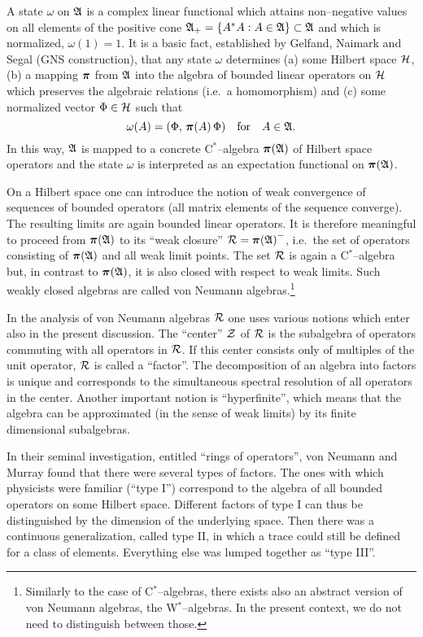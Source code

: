 A state $\omega$ on ${\mathfrak A}$ 
is a complex linear functional which 
attains non--negative values 
on all elements of the positive cone 
${\mathfrak A}_+ = \{ A^* A : A \in {\mathfrak A} \} \subset {\mathfrak A}$ 
and which is normalized, $\omega (1) = 1$. 
It is a basic fact, established by Gelfand, Naimark and 
Segal (GNS construction), that any state $\omega$ determines
(a) some Hilbert space ${\cal H}$, (b) a mapping 
$\mbox{{\boldmath $\pi$}}$ from ${\mathfrak A}$ into the algebra of bounded linear 
operators on ${\cal H}$ which preserves the algebraic 
relations (i.e.\ a homomorphism) and (c) some normalized vector 
$\Phi \in {\cal H}$ such that 
\begin{equation}
\omega (A) = (\Phi, \, \mbox{{\boldmath $\pi$}} (A) \, \Phi)
\quad \mbox{for} \quad A \in {\mathfrak A}.       
\end{equation}
In this way, ${\mathfrak A}$ is mapped to a concrete
C$^*$--algebra $\mbox{{\boldmath $\pi$}} ({\mathfrak A})$ of Hilbert space operators and 
the state $\omega$ is interpreted as an expectation functional 
on $\mbox{{\boldmath $\pi$}} ({\mathfrak A})$. 

On a Hilbert space one can introduce the 
notion of weak convergence of sequences of bounded operators 
(all matrix elements of the sequence converge). The 
resulting limits are again bounded linear operators.  
It is therefore meaningful to proceed from 
$\mbox{{\boldmath $\pi$}} ({\mathfrak A})$ to its ``weak closure'' 
${\cal R} = {\mbox{{\boldmath $\pi$}} ({\mathfrak A}) }^-$, i.e.\ the set of operators 
consisting of  $\mbox{{\boldmath $\pi$}} ({\mathfrak A})$ and all weak limit points. 
The set ${\cal R}$ is again a C$^*$--algebra but, in contrast 
to $\mbox{{\boldmath $\pi$}} ({\mathfrak A})$, it is also closed with respect to weak limits. 
Such weakly closed algebras are called 
von Neumann algebras.\footnote{Similarly to the 
case of C$^*$--algebras, there exists also an abstract version of 
von Neumann algebras, the W$^*$--algebras. In the present context, 
we do not need to distinguish between those.}

In the analysis of von Neumann algebras ${\cal R}$ one uses 
various notions which enter also in the present discussion. 
The ``center'' $\cal Z$ of $\cal R$ is the subalgebra 
of operators commuting with all operators in $\cal R$.
If this center consists only of multiples of the unit operator, $\cal
R$ is called a ``factor''. The decomposition of an algebra into
factors is unique and corresponds to the simultaneous 
spectral resolution of all operators in the
center. Another important notion is ``hyperfinite'', which
means that the algebra can be approximated (in the sense of 
weak limits) by its finite dimensional subalgebras. 

In their seminal investigation, entitled ``rings of operators'', 
von Neumann and Murray found that there were several types of
factors. The ones with which physicists were familiar (``type I'')
correspond to the algebra of all bounded operators on some  
Hilbert space. Different factors of type I can thus be distinguished 
by the dimension of the underlying space. 
Then there was a continuous generalization, called type II, in
which a trace could still be defined for a class of
elements. Everything else was lumped together as ``type III''. 

